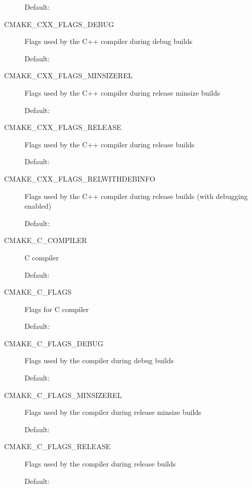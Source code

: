 \documentclass[letterpaper,10pt,english]{sphinxmanual}
\begin{document}
\begin{description}
Default:

\item[{\index{CMAKE\_CXX\_FLAGS\_DEBUG (CMake option)}CMAKE\_CXX\_FLAGS\_DEBUG}] \leavevmode
Flags used by the C++ compiler during debug builds

Default: 

\item[{\index{CMAKE\_CXX\_FLAGS\_MINSIZEREL (CMake option)}CMAKE\_CXX\_FLAGS\_MINSIZEREL}] \leavevmode
Flags used by the C++ compiler during release minsize builds

Default: 

\item[{\index{CMAKE\_CXX\_FLAGS\_RELEASE (CMake option)}CMAKE\_CXX\_FLAGS\_RELEASE}] \leavevmode
Flags used by the C++ compiler during release builds

Default: 

\item[{\index{CMAKE\_CXX\_FLAGS\_RELWITHDEBINFO (CMake option)}CMAKE\_CXX\_FLAGS\_RELWITHDEBINFO}] \leavevmode
Flags used by the C++ compiler during release builds (with
debugging enabled)

Default: 

\item[{\index{CMAKE\_C\_COMPILER (CMake option)}CMAKE\_C\_COMPILER}] \leavevmode
C compiler

Default: 

\item[{\index{CMAKE\_C\_FLAGS (CMake option)}CMAKE\_C\_FLAGS}] \leavevmode
Flags for C compiler

Default:

\item[{\index{CMAKE\_C\_FLAGS\_DEBUG (CMake option)}CMAKE\_C\_FLAGS\_DEBUG}] \leavevmode
Flags used by the compiler during debug
builds

Default: 

\item[{\index{CMAKE\_C\_FLAGS\_MINSIZEREL (CMake option)}CMAKE\_C\_FLAGS\_MINSIZEREL}] \leavevmode
Flags used by the compiler during
release minsize builds

Default: 

\item[{\index{CMAKE\_C\_FLAGS\_RELEASE (CMake option)}CMAKE\_C\_FLAGS\_RELEASE}] \leavevmode
Flags used by the compiler during release
builds

Default: 


\end{description}
\end{document}
